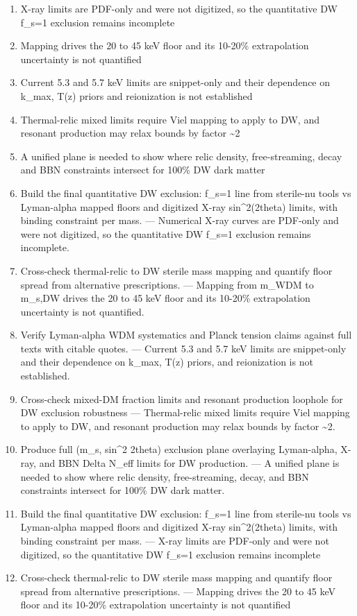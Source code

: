 \documentclass[11pt,a4paper]{article}
\begin{document}
\begin{enumerate}
  \item X-ray limits are PDF-only and were not digitized, so the quantitative DW f\_s=1 exclusion remains incomplete
  \item Mapping drives the 20 to 45 keV floor and its 10-20\% extrapolation uncertainty is not quantified
  \item Current 5.3 and 5.7 keV limits are snippet-only and their dependence on k\_max, T(z) priors and reionization is not established
  \item Thermal-relic mixed limits require Viel mapping to apply to DW, and resonant production may relax bounds by factor \textasciitilde{}2
  \item A unified plane is needed to show where relic density, free-streaming, decay and BBN constraints intersect for 100\% DW dark matter
  \item Build the final quantitative DW exclusion: f\_s=1 line from sterile-nu tools vs Lyman-alpha mapped floors and digitized X-ray sin\textasciicircum{}2(2theta) limits, with binding constraint per mass. --- Numerical X-ray curves are PDF-only and were not digitized, so the quantitative DW f\_s=1 exclusion remains incomplete.
  \item Cross-check thermal-relic to DW sterile mass mapping and quantify floor spread from alternative prescriptions. --- Mapping from m\_WDM to m\_s,DW drives the 20 to 45 keV floor and its 10-20\% extrapolation uncertainty is not quantified.
  \item Verify Lyman-alpha WDM systematics and Planck tension claims against full texts with citable quotes. --- Current 5.3 and 5.7 keV limits are snippet-only and their dependence on k\_max, T(z) priors, and reionization is not established.
  \item Cross-check mixed-DM fraction limits and resonant production loophole for DW exclusion robustness --- Thermal-relic mixed limits require Viel mapping to apply to DW, and resonant production may relax bounds by factor \textasciitilde{}2.
  \item Produce full (m\_s, sin\textasciicircum{}2 2theta) exclusion plane overlaying Lyman-alpha, X-ray, and BBN Delta N\_eff limits for DW production. --- A unified plane is needed to show where relic density, free-streaming, decay, and BBN constraints intersect for 100\% DW dark matter.
  \item Build the final quantitative DW exclusion: f\_s=1 line from sterile-nu tools vs Lyman-alpha mapped floors and digitized X-ray sin\textasciicircum{}2(2theta) limits, with binding constraint per mass. --- X-ray limits are PDF-only and were not digitized, so the quantitative DW f\_s=1 exclusion remains incomplete
  \item Cross-check thermal-relic to DW sterile mass mapping and quantify floor spread from alternative prescriptions. --- Mapping drives the 20 to 45 keV floor and its 10-20\% extrapolation uncertainty is not quantified
\end{enumerate}
\end{document}
